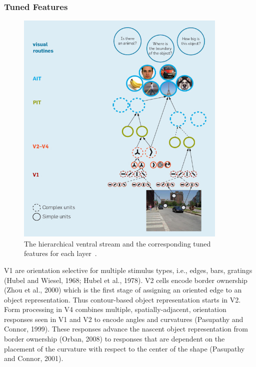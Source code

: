 \subsubsection{Tuned Features}
\begin{figure}[h!]
	\centering
	\includegraphics[width=0.9\textwidth]{pics/serre.jpg}
	\caption{The hierarchical ventral stream and the corresponding tuned features for each layer~\cite{serre2010neuromorphic}.}
	\label{Fig:serre}
\end{figure}
V1 are orientation selective for multiple stimulus types, i.e., edges, bars, gratings (Hubel and Wiesel, 1968; Hubel et al., 1978).
V2 cells encode border ownership (Zhou et al., 2000) which is the first stage of assigning an oriented edge to an object representation.
Thus contour-based object representation starts in V2.
Form processing in V4 combines multiple, spatially-adjacent, orientation responses seen in V1 and V2 to encode angles and curvatures (Pasupathy and Connor, 1999).
These responses advance the nascent object representation from border ownership (Orban, 2008) to responses that are dependent on the placement of the curvature with respect to the center of the shape (Pasupathy and Connor, 2001).

